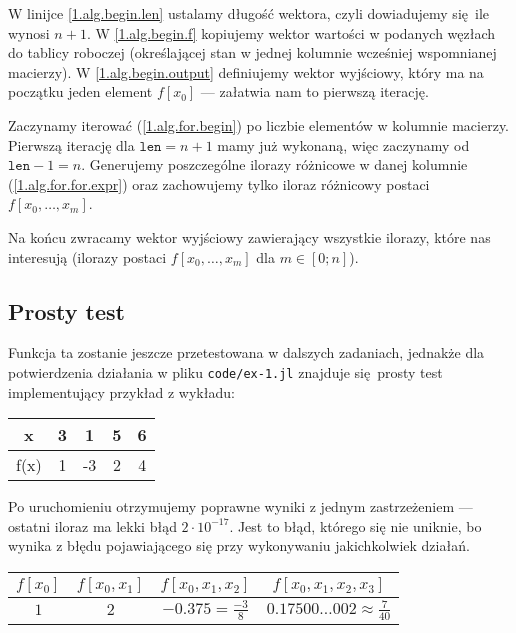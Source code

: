 \documentclass[10pt]{article}
\begin{document}
W linijce \ref{1.alg.begin.len} ustalamy długość wektora, czyli dowiadujemy się ile wynosi $n+1$. W \ref{1.alg.begin.f} kopiujemy wektor wartości w podanych węzłach do tablicy roboczej (określającej stan w jednej kolumnie wcześniej wspomnianej macierzy). W \ref{1.alg.begin.output} definiujemy wektor wyjściowy, który ma na początku jeden element $f[x_0]$ — załatwia nam to pierwszą iterację.

Zaczynamy iterować (\ref{1.alg.for.begin}) po liczbie elementów w kolumnie macierzy. Pierwszą iterację dla $\texttt{len} = n+1$ mamy już wykonaną, więc zaczynamy od $\texttt{len}-1 = n$. Generujemy poszczególne ilorazy różnicowe w danej kolumnie (\ref{1.alg.for.for.expr}) oraz zachowujemy tylko iloraz różnicowy postaci $f[x_0,\dots,x_m]$.

Na końcu zwracamy wektor wyjściowy zawierający wszystkie ilorazy, które nas interesują (ilorazy postaci $f[x_0,\dots,x_m]$ dla $m \in [0;n]$).

\subsection{Prosty test}

Funkcja ta zostanie jeszcze przetestowana w dalszych zadaniach, jednakże dla potwierdzenia działania w pliku \texttt{code/ex-1.jl} znajduje się prosty test implementujący przykład z wykładu:
\begin{center}
    \begin{tabular}{c || c c c c}
        x & 3 & 1 & 5 & 6\\
        \hline
        f(x) & 1 & -3 & 2 & 4\\
    \end{tabular}
\end{center}

Po uruchomieniu otrzymujemy poprawne wyniki z jednym zastrzeżeniem — ostatni iloraz ma lekki błąd $2 \cdot 10^{-17}$. Jest to błąd, którego się nie uniknie, bo wynika z błędu pojawiającego się przy wykonywaniu jakichkolwiek działań.
\begin{center}
    \begin{tabular}{c c c c}
        $f[x_0]$ & $f[x_0,x_1]$ & $f[x_0,x_1,x_2]$ & $f[x_0,x_1,x_2,x_3]$\\
        \hline
        $1$ & $2$ & $-0.375 = \frac{-3}{8}$ & $0.17500\dots002 \approx \frac{7}{40}$
    \end{tabular}
\end{center}
\end{document}
